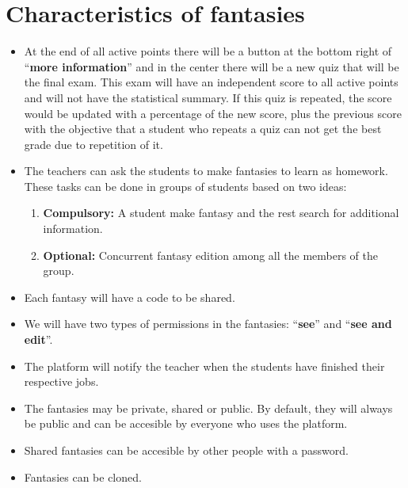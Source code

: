 \section{Characteristics of fantasies}
\begin{itemize}
	\item At the end of all active points there will be a button at the bottom right of ``\textbf{more information}'' and in the center there will be a new quiz that will be the final exam. This exam will have an independent score to all active points and will not have the statistical summary. If this quiz is repeated, the score would be updated with a percentage of the new score, plus the previous score with the objective that a student who repeats a quiz can not get the best grade due to repetition of it.
	\item The teachers can ask the students to make fantasies to learn as homework. These tasks can be done in groups of students based on two ideas:
	\begin{enumerate}
		\item \textbf{Compulsory:} A student make fantasy and the rest search for additional information.
		\item \textbf{Optional:} Concurrent fantasy edition among all the members of the group.
	\end{enumerate}
	\item Each fantasy will have a code to be shared.
	\item We will have two types of permissions in the fantasies: ``\textbf{see}'' and ``\textbf{see and edit}''.
	\item The platform will notify the teacher when the students have finished their respective jobs.
	\item The fantasies may be private, shared or public. By default, they will always be public and can be accesible by everyone who uses the platform.
	\item Shared fantasies can be accesible by other people with a password.
	\item Fantasies can be cloned.
\end{itemize}

